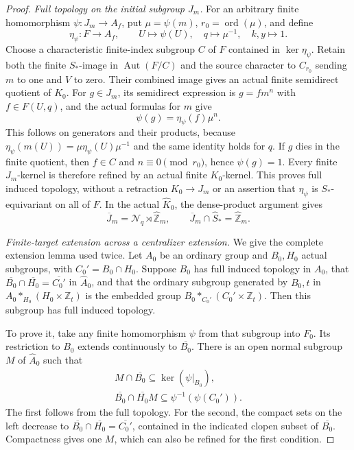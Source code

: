 \begin{proof}
\emph{Full topology on the initial subgroup \(J_m\).}
For an arbitrary finite homomorphism \(\psi:J_m\to A_f\), put
\(\mu=\psi(m)\), \(r_0=\operatorname{ord}(\mu)\), and define
\[
 \eta_\psi:F\to A_f,
 \qquad U\mapsto\psi(U),\quad q\mapsto\mu^{-1},\quad k,y\mapsto1.
\]
Choose a characteristic finite-index subgroup \(C\) of \(F\)
contained in \(\ker\eta_\psi\). Retain both the finite
\(S_*\)-image in \(\operatorname{Aut}(F/C)\) and the source
character to \(C_{r_0}\) sending \(m\) to one and \(V\) to zero.
Their combined image gives an actual finite semidirect quotient
of \(K_0\). For \(g\in J_m\), its semidirect expression is
\(g=fm^n\) with \(f\in F(U,q)\), and the actual formulas for
\(m\) give
\[
                          \psi(g)=\eta_\psi(f)\mu^n.
\]
This follows on generators and their products, because
\(\eta_\psi(m(U))=\mu\eta_\psi(U)\mu^{-1}\) and the same
identity holds for \(q\). If \(g\) dies in the finite quotient,
then \(f\in C\) and \(n\equiv0\pmod{r_0}\), hence
\(\psi(g)=1\). Every finite \(J_m\)-kernel is therefore refined
by an actual finite \(K_0\)-kernel. This proves full induced
topology, without a retraction \(K_0\to J_m\) or an assertion
that \(\eta_\psi\) is \(S_*\)-equivariant on all of \(F\).
In the actual \(\widehat K_0\), the dense-product argument gives
\[
 \overline J_m=\mathcal N_q\rtimes\widehat{\mathbb Z}_m,
 \qquad
 \overline J_m\cap\widehat S_*=\widehat{\mathbb Z}_m.
\]

\emph{Finite-target extension across a centralizer extension.}
We give the complete extension lemma used twice. Let \(A_0\)
be an ordinary group and \(B_0,H_0\) actual subgroups, with
\(C_0'=B_0\cap H_0\). Suppose \(B_0\) has full induced
topology in \(A_0\), that
\(\overline{B_0}\cap\overline{H_0}=\overline{C_0'}\) in
\(\widehat A_0\), and that the ordinary subgroup generated by
\(B_0,t\) in \(A_0*_{H_0}(H_0\times\mathbb Z_t)\) is
the embedded group \(B_0*_{C_0'}(C_0'\times\mathbb Z_t)\).
Then this subgroup has full induced topology.

To prove it, take any finite homomorphism \(\psi\) from that
subgroup into \(F_0\). Its restriction to \(B_0\) extends
continuously to \(\overline{B_0}\). There is an open normal
subgroup \(M\) of \(\widehat A_0\) such that
\begin{equation}\label{eq:B177-finite-intersection}
 \begin{gathered}
 M\cap\overline{B_0}\subseteq\ker(\psi|_{B_0}),\\
 \overline{B_0}\cap\overline{H_0}M
      \subseteq\psi^{-1}(\psi(C_0')).
 \end{gathered}
\end{equation}
The first follows from the full topology. For the second, the
compact sets on the left decrease to
\(\overline{B_0}\cap\overline{H_0}=\overline{C_0'}\),
contained in the indicated clopen subset of \(\overline{B_0}\).
Compactness gives one \(M\), which can also be refined for the
first condition.


\end{proof}
